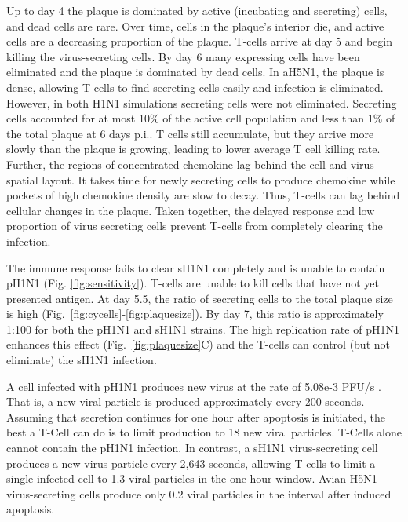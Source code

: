\documentclass[10pt]{article}
\begin{document}
Up to day 4 the plaque is dominated by active (incubating and secreting) cells, and dead cells are rare. Over time, cells in the plaque's interior die, and active cells are a decreasing proportion of the plaque. T-cells arrive at day 5 and begin killing the virus-secreting cells. By day 6 many expressing cells have been eliminated and the plaque is dominated by dead cells.  In aH5N1, the plaque is dense, allowing T-cells to find secreting cells easily and infection is eliminated.  However, in both H1N1 simulations secreting cells were not eliminated.  Secreting cells accounted for at most 10\% of the active cell population and less than 1\% of the total plaque at 6 days p.i..  T cells still accumulate, but they arrive more slowly than the plaque is growing, leading to lower average T cell killing rate.  Further, the regions of concentrated chemokine lag behind the cell and virus spatial layout.  It takes time for newly secreting cells to produce chemokine while pockets of high chemokine density are slow to decay.  Thus, T-cells can lag behind cellular changes in the plaque.  Taken together, the delayed response and low proportion of virus secreting cells prevent T-cells from completely clearing the infection.

The immune response fails to clear sH1N1 completely and is unable to contain pH1N1 (Fig. \ref{fig:sensitivity}).  T-cells are unable to kill cells that have not yet presented antigen.  At day 5.5, the ratio of secreting cells to the total plaque size is high (Fig.~\ref{fig:cycells}-\ref{fig:plaquesize}). By day 7, this ratio is approximately 1:100 for both the pH1N1 and sH1N1 strains.  The high replication rate of pH1N1 enhances this effect (Fig.~\ref{fig:plaquesize}C) and the T-cells can control (but not eliminate) the sH1N1 infection.

A cell infected with pH1N1 produces new virus at the rate of 5.08e-3 PFU/s \cite{Mitchell2011}.  That is, a new viral particle is produced approximately every 200 seconds.  Assuming that secretion continues for one hour after apoptosis is initiated, the best a T-Cell can do is to limit production to 18 new viral particles.  T-Cells alone cannot contain the pH1N1 infection.  In contrast, a sH1N1 virus-secreting cell produces a new virus particle every 2,643 seconds, allowing T-cells to limit a single infected cell to 1.3 viral particles in the one-hour window.  Avian H5N1 virus-secreting cells produce only 0.2 viral particles in the interval after induced apoptosis. 
\end{document}
